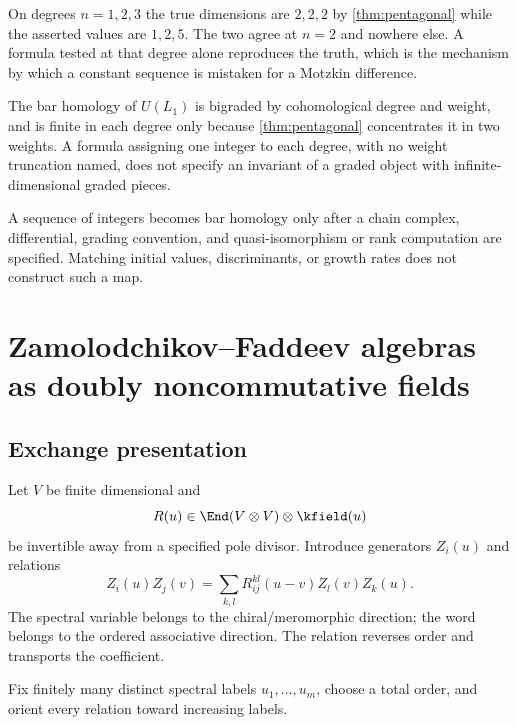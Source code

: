 \begin{remark}
On degrees \(n=1,2,3\) the true dimensions are \(2,2,2\) by
\cref{thm:pentagonal} while the asserted values are \(1,2,5\).  The two agree at
\(n=2\) and nowhere else.  A formula tested at that degree alone reproduces the
truth, which is the mechanism by which a constant sequence is mistaken for a
Motzkin difference.
\end{remark}

\begin{remark}
The bar homology of \(U(L_1)\) is bigraded by cohomological degree and weight,
and is finite in each degree only because \cref{thm:pentagonal} concentrates it
in two weights.  A formula assigning one integer to each degree, with no weight
truncation named, does not specify an invariant of a graded object with
infinite-dimensional graded pieces.
\end{remark}

\begin{nogobox}[title={No-go theorem 15: a scalar sequence is not homology data}]
A sequence of integers becomes bar homology only after a chain complex, differential, grading convention, and quasi-isomorphism or rank computation are specified.  Matching initial values, discriminants, or growth rates does not construct such a map.
\end{nogobox}

\chapter{Zamolodchikov--Faddeev algebras as doubly noncommutative fields}\label{chap:zf}

\section{Exchange presentation}
Let \(V\) be finite dimensional and
\[
 R(u)\in\End(V\otimes V)\otimes\kfield(u)
\]
be invertible away from a specified pole divisor.  Introduce generators \(Z_i(u)\) and relations
\[
 Z_i(u)Z_j(v)=
 \sum_{k,l}R_{ij}^{kl}(u-v)Z_l(v)Z_k(u).
\]
The spectral variable belongs to the chiral/meromorphic direction; the word belongs to the ordered associative direction.  The relation reverses order and transports the coefficient.

Fix finitely many distinct spectral labels \(u_1,\ldots,u_m\), choose a total order, and orient every relation toward increasing labels.

